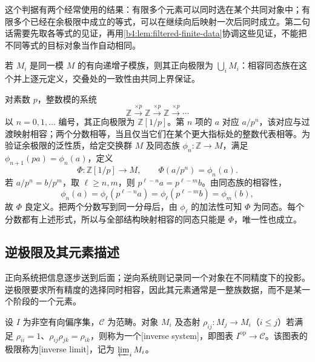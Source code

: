 这个判据有两个经常使用的结果：有限多个元素可以同时选在某个共同对象中；有限多个已经在余极限中成立的等式，可以在继续向后映射一次后同时成立。第二句话需要先取各等式的见证，再用\cref{b4:lem:filtered-finite-data}协调这些见证，不能把不同等式的目标对象当作自动相同。

\begin{example}[递增的并与分母]\label{b4:exm:direct-limit-localization}
	若 \(M_i\) 是同一模 \(M\) 的有向递增子模族，则其正向极限为 \(\bigcup_iM_i\)：相容同态族在这个并上逐元定义，交叠处的一致性由共同上界保证。

	\ProseParagraphBreak
	对素数 \(p\)，整数模的系统
	\[
		\mathbb Z\xrightarrow{\times p}\mathbb Z \xrightarrow{\times p}\mathbb Z\xrightarrow{\times p}\cdots
	\]
	以 \(n=0,1,\ldots\) 编号，其正向极限为 \(\mathbb Z[1/p]\)。第 \(n\) 项的 \(a\) 对应 \(a/p^n\)，该对应与过渡映射相容；两个分数相等，当且仅当它们在某个更大指标处的整数代表相等。为验证余极限的泛性质，给定交换群 \(M\) 及同态族 \(\phi_n:\mathbb Z\rightarrow M\)，满足 \(\phi_{n+1}(pa)=\phi_n(a)\)，定义
	\[
		\Phi:\mathbb Z[1/p]\longrightarrow M,\qquad \Phi(a/p^n)=\phi_n(a).
	\]
	若 \(a/p^n=b/p^m\)，取 \(\ell\ge n,m\)，则 \(p^{\ell-n}a=p^{\ell-m}b\)。由同态族的相容性，
	\[
		\phi_n(a)=\phi_\ell(p^{\ell-n}a) =\phi_\ell(p^{\ell-m}b)=\phi_m(b),
	\]
	故 \(\Phi\) 良定义。把两个分数写到同一分母后，由 \(\phi_\ell\) 的加法性可知 \(\Phi\) 为同态。每个分数都有上述形式，所以与全部结构映射相容的同态只能是 \(\Phi\)，唯一性也成立。
\end{example}

\subsection{逆极限及其元素描述}
\label{b4:subsec:0203:02}

正向系统把信息逐步送到后面；逆向系统则记录同一个对象在不同精度下的投影。逆极限要求所有精度的选择同时相容，因此其元素通常是一整族数据，而不是某一个阶段的一个元素。

\begin{definition}[逆向系统与逆极限]\label{b4:def:inverse-system}
	设 \(I\) 为非空有向偏序集，\(\mathcal C\) 为范畴。对象 \(M_i\) 及态射 \(\rho_{ij}:M_j\rightarrow M_i\)（\(i\le j\)）若满足 \(\rho_{ii}=1\)、\(\rho_{ij}\rho_{jk}=\rho_{ik}\)，则称为一个[inverse system]，即图表 \(I^{\mathrm{op}}\rightarrow\mathcal C\)。该图表的极限称为[inverse limit]，记为 \(\varprojlim_i M_i\)。
\end{definition}


